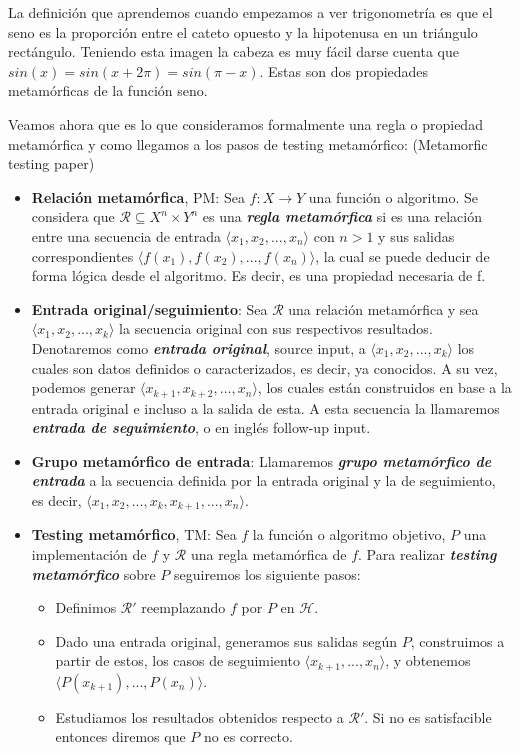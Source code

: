 La definición que aprendemos cuando empezamos a ver trigonometría es que el seno es la proporción entre el cateto opuesto y la hipotenusa en un triángulo rectángulo. Teniendo esta imagen la cabeza es muy fácil darse cuenta que $sin(x)=sin(x + 2\pi)=sin(\pi-x)$. Estas son dos propiedades metamórficas de la función seno. \newline

Veamos ahora que es lo que consideramos formalmente una regla o propiedad metamórfica y como llegamos a los pasos de testing metamórfico: (Metamorfic testing paper)

\begin{itemize}
    \item \textbf{Relación metamórfica}, PM: Sea $f: X \rightarrow Y$ una función o algoritmo. Se considera que $\mathscr{R} \subseteq X^{n} \times Y^{n}$ es una \textbf{\textit{regla metamórfica}} si es una relación entre una secuencia de entrada $\langle x_{1},x_{2},...,x_{n}\rangle$ con $n>1$ y sus salidas correspondientes $\langle f(x_{1}),f(x_{2}),...,f(x_{n})\rangle$, la cual se puede deducir de forma lógica desde el algoritmo. Es decir, es una propiedad necesaria de f.
    \item \textbf{Entrada original/seguimiento}: Sea $\mathscr{R}$ una relación metamórfica y sea $\langle x_{1},x_{2},...,x_{k}\rangle$ la secuencia original con sus respectivos resultados. Denotaremos como \textbf{\textit{entrada original}}, source input, a   $\langle x_{1},x_{2},...,x_{k}\rangle$  los cuales son datos definidos o caracterizados, es decir, ya conocidos. A su vez, podemos generar $\langle x_{k+1},x_{k+2},...,x_{n}\rangle$, los cuales están construidos en base a la entrada original e incluso a la salida de esta. A esta secuencia la llamaremos \textbf{\textit{entrada de seguimiento}}, o en inglés follow-up input.
    \item \textbf{Grupo metamórfico de entrada}: Llamaremos \textbf{\textit{grupo metamórfico de entrada}} a la secuencia definida por la entrada original y la de seguimiento, es decir, $\langle x_{1},x_{2},...,x_{k},x_{k+1},...,x_{n}\rangle$.
    \item \textbf{Testing metamórfico}, TM: Sea $f$ la función o algoritmo objetivo, $P$ una implementación de $f$ y $\mathscr{R}$ una regla metamórfica de $f$. Para realizar \textbf{\textit{testing metamórfico}} sobre $P$ seguiremos los siguiente pasos:
    \begin{itemize}
        \item Definimos $\mathscr{R}'$ reemplazando $f$ por $P$ en $\mathscr{H}$.
        \item Dado una entrada original, generamos sus salidas según $P$, construimos a partir de estos, los casos de seguimiento $\langle x_{k+1},...,x_{n}\rangle$, y obtenemos $\langle P(x_{k+1}),...,P(x_{n})\rangle$.
        \item Estudiamos los resultados obtenidos respecto a $\mathscr{R}'$. Si no es satisfacible entonces diremos que $P$ no es correcto.
    \end{itemize}
\end{itemize}

